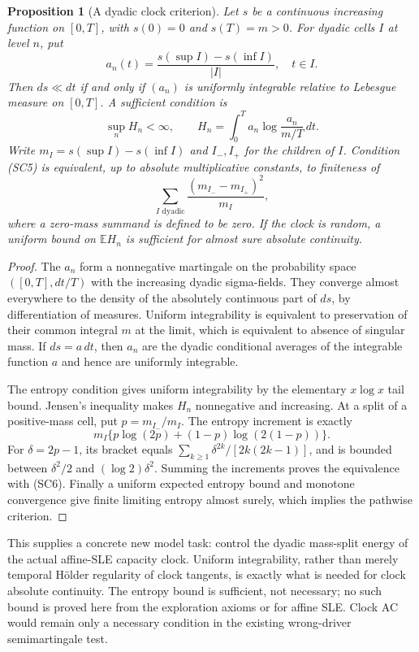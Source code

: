 \documentclass[11pt]{article}
\newtheorem{proposition}[theorem]{Proposition}
\theoremstyle{definition}\newtheorem{definition}[theorem]{Definition}
\theoremstyle{remark}\newtheorem{remark}[theorem]{Remark}
\begin{document}
\begin{proposition}[A dyadic clock criterion]
\label{prop:dyadic-clock-entropy}
Let $s$ be a continuous increasing function on $[0,T]$, with $s(0)=0$
and $s(T)=m>0$. For dyadic cells $I$ at level $n$, put
\[
 a_n(t)=\frac{s(\sup I)-s(\inf I)}{|I|},\quad t\in I.
\]
Then $ds\ll dt$ if and only if $(a_n)$ is uniformly integrable
relative to Lebesgue measure on $[0,T]$. A sufficient condition is
\[
 \sup_n H_n<\infty,\qquad
 H_n=\int_0^T a_n\log\frac{a_n}{m/T}\,dt.
 \tag{SC5}
\]
Write $m_I=s(\sup I)-s(\inf I)$ and $I_-,I_+$ for the children of $I$.
Condition (SC5) is equivalent, up to absolute multiplicative constants,
to finiteness of
\[
 \sum_{I\text{ dyadic}}
       \frac{(m_{I_-}-m_{I_+})^2}{m_I},
 \tag{SC6}
\]
where a zero-mass summand is defined to be zero. If the clock is random,
a uniform bound on $\mathbb E H_n$ is sufficient for almost sure
absolute continuity.
\end{proposition}
\begin{proof}
The $a_n$ form a nonnegative martingale on the probability space
$([0,T],dt/T)$ with the increasing dyadic sigma-fields. They converge
almost everywhere to the density of the absolutely continuous part of
$ds$, by differentiation of measures. Uniform integrability is
equivalent to preservation of their common integral $m$ at the limit,
which is equivalent to absence of singular mass. If $ds=a\,dt$,
then $a_n$ are the dyadic conditional averages of the integrable
function $a$ and hence are uniformly integrable.

The entropy condition gives uniform integrability by the elementary
$x\log x$ tail bound. Jensen's inequality makes $H_n$ nonnegative
and increasing. At a split of a positive-mass cell, put
$p=m_{I_-}/m_I$. The entropy increment is exactly
\[
 m_I\{p\log(2p)+(1-p)\log(2(1-p))\}.
\]
For $\delta=2p-1$, its bracket equals
$\sum_{k\ge1}\delta^{2k}/[2k(2k-1)]$, and is bounded between
$\delta^2/2$ and $(\log2)\delta^2$. Summing the increments proves
the equivalence with (SC6). Finally a uniform expected entropy bound
and monotone convergence give finite limiting entropy almost surely,
which implies the pathwise criterion.
\end{proof}

This supplies a concrete new model task: control the dyadic mass-split
energy of the actual affine-SLE capacity clock. Uniform integrability,
rather than merely temporal H\"older regularity of clock tangents,
is exactly what is needed for clock absolute continuity. The entropy
bound is sufficient, not necessary; no such bound is proved here from
the exploration axioms or for affine SLE. Clock AC would remain only a
necessary condition in the existing wrong-driver semimartingale test.
\end{document}
